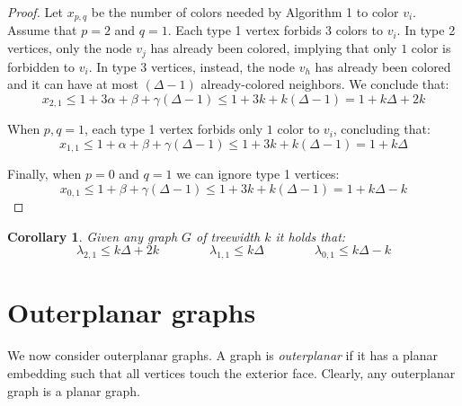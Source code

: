 \documentclass[12pt,a4paper]{article}
\newtheorem{corollary}{Corollary}
\begin{document}
\begin{proof}
		Let $x_{p,q}$ be the number of colors needed by Algorithm 1 to color $v_i$. Assume that $p = 2$ and $q = 1$. Each type 1 vertex forbids $3$ colors to $v_i$. In type 2 vertices, only the node $v_j$ has already been colored, implying that only $1$ color is forbidden to $v_i$. In type 3 vertices, instead, the node $v_h$ has already been colored and it can have at most $(\Delta-1)$ already-colored neighbors. We conclude that:
		\[x_{2,1} \leq 1+ 3\alpha + \beta + \gamma(\Delta-1) \leq 1+ 3k + k(\Delta-1) = 1+k\Delta + 2k\]

		When $p,q = 1$, each type 1 vertex forbids only $1$ color to $v_i$, concluding that:
		\[x_{1,1} \leq 1+ \alpha + \beta + \gamma(\Delta-1) \leq 1+3k + k(\Delta-1) = 1+k\Delta\]

		Finally, when $p = 0$ and $q = 1$ we can ignore type 1 vertices:
		\[x_{0,1} \leq 1 + \beta + \gamma(\Delta-1) \leq 1+3k + k(\Delta-1) = 1+k\Delta -k\]
	\end{proof}

	\begin{corollary}
		Given any graph $G$ of treewidth $k$ it holds that:
    	\[\lambda_{2,1} \leq k\Delta+2k \qquad\qquad \lambda_{1,1} \leq k\Delta \qquad\qquad \lambda_{0,1} \leq k\Delta-k\]
	\end{corollary}

	\section{Outerplanar graphs}

	We now consider outerplanar graphs. A graph is \textit{outerplanar} if it has a planar embedding such that all vertices touch the exterior face. Clearly, any outerplanar graph is a planar graph.
\end{document}
